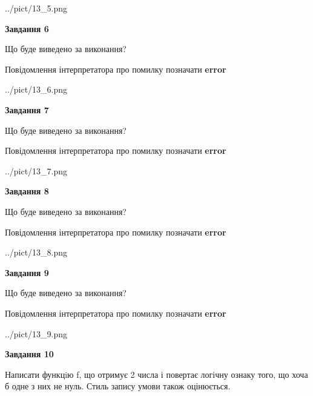 \documentclass[12pt, ukrainian]{article}
\begin{document}
{\begin {large}
\begin{center}
	{../pict/13_5.png}
\end{center}
\newpage

{\begin {center}\textbf{Завдання 6}\end {center}}\par
Що буде виведено за виконання? \par
Повідомлення інтерпретатора про помилку позначати \textbf{error}

\begin{center}
	{../pict/13_6.png}
\end{center}
\newpage

{\begin {center}\textbf{Завдання 7}\end {center}}\par
Що буде виведено за виконання? \par
Повідомлення інтерпретатора про помилку позначати \textbf{error}

\begin{center}
	{../pict/13_7.png}
\end{center}
\newpage

{\begin {center}\textbf{Завдання 8}\end {center}}\par
Що буде виведено за виконання? \par
Повідомлення інтерпретатора про помилку позначати \textbf{error}

\begin{center}
	{../pict/13_8.png}
\end{center}
\newpage

{\begin {center}\textbf{Завдання 9}\end {center}}\par
Що буде виведено за виконання? \par
Повідомлення інтерпретатора про помилку позначати \textbf{error}

\begin{center}
	{../pict/13_9.png}
\end{center}
\newpage

{\begin {center}\textbf{Завдання 10}\end {center}}\par

Написати функцiю f, що отримує 2 числа і повертає логічну ознаку того, що хоча б одне з них не нуль. Стиль запису умови також оцінюється.\par
\newpage

\end {large}}
\end{document}
